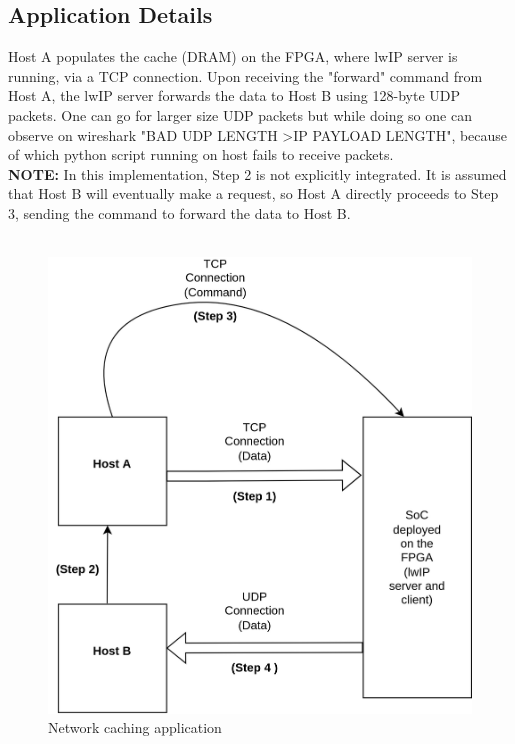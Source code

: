\documentclass[12pt]{report}
\begin{document}
\begin{appendices}
\section{Application Details}
Host A populates the cache (DRAM) on the FPGA, where lwIP server is running, via a TCP connection. Upon receiving the "forward" command from Host A, the lwIP server forwards the data to Host B using 128-byte UDP packets. One can go for larger size UDP packets but while doing so one can observe on wireshark "BAD UDP LENGTH \textgreater IP PAYLOAD LENGTH", because of which python script running on host fails to receive packets. \\
\textbf{NOTE:} In this implementation, Step 2 is not explicitly integrated. It is assumed that Host B will eventually make a request, so Host A directly proceeds to Step 3, sending the command to forward the data to Host B. \\ \\

\begin{figure}[h]
			\centering
			\includegraphics[width=12cm]{../figures/caching_app.jpg}
			\caption{Network caching application}
			\label{fig:NIC-Proc-top-level5}
		\end{figure}
  
\end{appendices}
\end{document}
